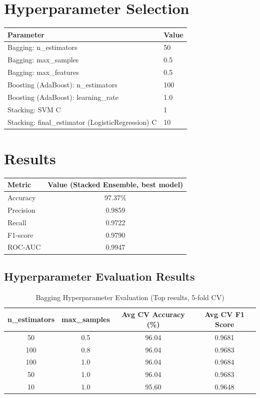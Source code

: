 \documentclass[12pt,a4paper]{article}
\begin{document}
\section{Hyperparameter Selection}

\begin{tabular}{ll}
\toprule
Parameter & Value\\
\midrule
Bagging: n\_estimators & 50 \\
Bagging: max\_samples & 0.5 \\
Bagging: max\_features & 0.5 \\
Boosting (AdaBoost): n\_estimators & 100 \\
Boosting (AdaBoost): learning\_rate & 1.0 \\
Stacking: SVM C & 1 \\
Stacking: final\_estimator (LogisticRegression) C & 10 \\
\bottomrule
\end{tabular}

\section{Results}

\begin{tabular}{lc}
\toprule
Metric & Value (Stacked Ensemble, best model)\\
\midrule
Accuracy & 97.37\% \\
Precision & 0.9859 \\
Recall & 0.9722 \\
F1-score & 0.9790 \\
ROC-AUC & 0.9947 \\
\bottomrule
\end{tabular}

\subsection*{Hyperparameter Evaluation Results}

\begin{table}[H]
\centering
\caption{Bagging Hyperparameter Evaluation (Top results, 5-fold CV)}
\begin{tabular}{cccc}
\toprule
n\_estimators & max\_samples & Avg CV Accuracy (\%) & Avg CV F1 Score \\
\midrule
50  & 0.5 & 96.04 & 0.9681 \\
100 & 0.8 & 96.04 & 0.9683 \\
100 & 1.0 & 96.04 & 0.9684 \\
50  & 1.0 & 96.04 & 0.9683 \\
10  & 1.0 & 95.60 & 0.9648 \\
\bottomrule
\end{tabular}
\end{table}
\end{document}

